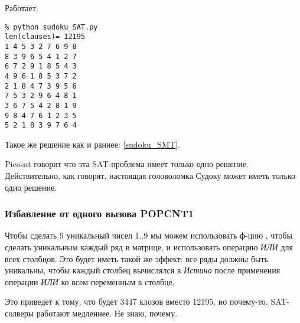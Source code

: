 Работает:

\begin{lstlisting}
% python sudoku_SAT.py
len(clauses)= 12195
1 4 5 3 2 7 6 9 8
8 3 9 6 5 4 1 2 7
6 7 2 9 1 8 5 4 3
4 9 6 1 8 5 3 7 2
2 1 8 4 7 3 9 5 6
7 5 3 2 9 6 4 8 1
3 6 7 5 4 2 8 1 9
9 8 4 7 6 1 2 3 5
5 2 1 8 3 9 7 6 4
\end{lstlisting}

Такое же решение как и раннее: \ref{sudoku_SMT}.

Picosat говорит что эта SAT-проблема имеет только одно решение.
Действительно, как говорят, настоящая головоломка Судоку может иметь только одно решение.

\subsubsection{Избавление от одного вызова POPCNT1}

Чтобы сделать 9 уникальный чисел 1..9 мы можем использовать ф-цию , чтобы сделать уникальным каждый ряд
в матрице, и использовать операцию \textit{ИЛИ} для всех столбцов.
Это будет иметь такой же эффект: все ряды должны быть уникальны, чтобы каждый столбец вычислялся в \textit{Истино}
после применения операции \textit{ИЛИ} ко всем переменным в столбце.

Это приведет к тому, что будет 3447 клозов вместо 12195, но почему-то, SAT-солверы работают медленнее. Не знаю, почему.

